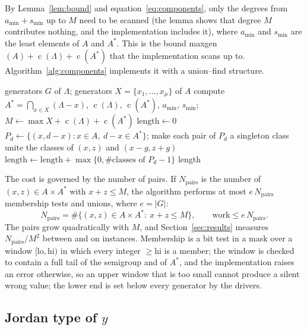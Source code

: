 \documentclass[11pt]{article}
\theoremstyle{definition}
\theoremstyle{remark}
\newcommand{\cond}{\operatorname{c}}
\begin{document}
By Lemma~\ref{lem:bound} and equation~\eqref{eq:components}, only the degrees from $a_{\min}+s_{\min}$ up to $M$ need to be scanned (the lemma shows that degree $M$ contributes nothing, and the implementation includes it),
where $a_{\min}$ and $s_{\min}$ are the least elements of $A$ and $A^*$. This is the bound maxgen$(A)+\cond(\Lambda)+\cond(A^*)$
that the implementation scans up to. Algorithm~\ref{alg:components} implements it with a union--find structure.

\begin{algorithm}[t]
\caption{Degree-wise torsion length of $I_A\otimes I_{A^*}$ from the definition.}\label{alg:components}
\begin{algorithmic}[1]
\Require generators $G$ of $\Lambda$; generators $X=\{x_1,\dots,x_\mu\}$ of $A$
\State compute $A^*=\bigcap_{x\in X}(\Lambda-x)$, $\cond(\Lambda)$, $\cond(A^*)$, $a_{\min}$, $s_{\min}$; $M\gets\max X+\cond(\Lambda)+\cond(A^*)$
\State $\text{length}\gets0$
  \State $P_d\gets\{(x,d-x):x\in A,\ d-x\in A^*\}$; make each pair of $P_d$ a singleton class
     unite the classes of $(x,z)$ and $(x-g,z+g)$ \EndIf
  \EndFor
  \State $\text{length}\gets\text{length}+\max\{0,\#\text{classes of }P_d-1\}$
\EndFor
\State \Return length
\end{algorithmic}
\end{algorithm}

The cost is governed by the number of pairs. If $N_{\mathrm{pairs}}$ is the number of $(x,z)\in A\times A^*$ with $x+z\le M$,
the algorithm performs at most $e\,N_{\mathrm{pairs}}$ membership tests and unions, where $e=|G|$:
\begin{equation}\label{eq:cost}
N_{\mathrm{pairs}}=\#\{(x,z)\in A\times A^*:\ x+z\le M\},\qquad \text{work}\le e\,N_{\mathrm{pairs}}.
\end{equation}
The pairs grow
quadratically with $M$, and Section~\ref{sec:results} measures $N_{\mathrm{pairs}}/M^2$ between \HardRatioMin{} and
\HardRatioMax{} on \NHard{} instances. Membership is a bit test in a mask over a window $[\mathrm{lo},\mathrm{hi})$ in which every
integer $\ge\mathrm{hi}$ is a member; the window is checked to contain a full tail of the semigroup and of $A^*$, and the
implementation raises an error otherwise, so an upper window that is too small cannot produce a silent wrong value; the lower end is set below every generator by the drivers.

\subsection{Jordan type of \texorpdfstring{$y$}{y}}
\end{document}
